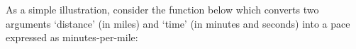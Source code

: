As a simple illustration, consider the function below which converts two
arguments `distance' (in miles) and `time' (in minutes and seconds) into a
pace expressed as minutes-per-mile:

{ \small
\noindent
\ttfamily
\hlstd{}\hlstd{\ \ }\hspace*{\fill}\\
\hlstd{}\hlopt{=\ }\hlstd{}\hlstd{}\hlopt{(}\hlopt{,\ }\hlopt{)}\hspace*{\fill}\\
\hlstd{}\hlstd{\ \ }\hlstd{}\hlstd{}\hlopt{(}\hlopt{$<$\ }\hlstd{}\hlstd{}\hlopt{)}\hspace*{\fill}\\
\hlstd{}\hlstd{\ \ \ \ }\hlstd{}\hlstd{}\hlopt{(}\hlstd{}\hlstd{}\hlopt{)}\hspace*{\fill}\\
\hlstd{}\hlstd{\ \ }\hlstd{}\hspace*{\fill}\\
\hlstd{\hspace*{\fill}\\
}\hlstd{\ \ }\hlstd{}\hspace*{\fill}\\
\hlstd{}\hlstd{\ \ }\hlopt{=\ }\hlstd{}\hlstd{}\hlopt{(}\hlopt{){*}}\hlstd{}\hlstd{}\hlopt{+\ (}\hlopt{{-}}\hlstd{}\hlstd{}\hlopt{(}\hlopt{)){*}}\hlstd{}\hlstd{}\hlopt{;}\hspace*{\fill}\\
\hlstd{}\hlstd{\ \ }\hlstd{}\hspace*{\fill}\\
\hlstd{}\hlstd{\ \ }\hlopt{=\ }\hlopt{/\ }\hlopt{;}\hspace*{\fill}\\
\hlstd{}\hlstd{\ \ }\hlstd{}\hspace*{\fill}\\
\hlstd{}\hlstd{\ \ }\hlopt{=\ }\hlstd{}\hlstd{}\hlopt{(}\hlopt{/}\hlstd{}\hlstd{}\hlopt{);}\hspace*{\fill}\\
}
